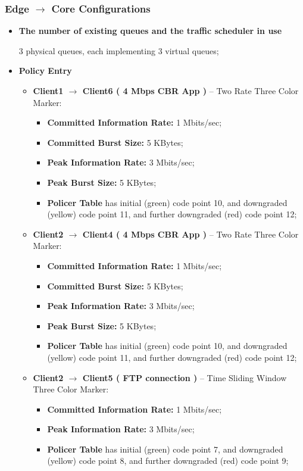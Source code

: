 \documentclass[conference,compsoc]{IEEEtran}
\begin{document}
     \subsubsection{Edge $\rightarrow$ Core Configurations}
     \begin{itemize}
     \item \textbf{The number of existing queues and the traffic scheduler in use} \par 
     3 physical queues, each implementing 3 virtual queues;  
     \vspace{5mm}
     \item \textbf{Policy Entry}
     \begin{itemize}
     
    	 \item \textbf{Client1 $\rightarrow$ Client6  ( 4 Mbps CBR App )} -- Two Rate Three Color Marker:
   	  	\begin{itemize}
   	 	 \item \textbf{Committed Information Rate:} 1 Mbits/sec;
   		  \item \textbf{Committed Burst Size:} 5 KBytes;
		    \item \textbf{Peak Information Rate:} 3 Mbits/sec;
		     \item \textbf{Peak Burst Size:} 5 KBytes;
  		   \item \textbf{Policer Table} has initial (green) code point 10, and downgraded (yellow) code point 11, and further downgraded (red) code point 12;
     		\end{itemize}
		
		\item \textbf{Client2 $\rightarrow$ Client4  ( 4 Mbps CBR App )} -- Two Rate Three Color Marker:
   	  	\begin{itemize}
   	 	 \item \textbf{Committed Information Rate:} 1 Mbits/sec;
   		  \item \textbf{Committed Burst Size:} 5 KBytes;
		    \item \textbf{Peak Information Rate:} 3 Mbits/sec;
		     \item \textbf{Peak Burst Size:} 5 KBytes;
  		   \item \textbf{Policer Table} has initial (green) code point 10, and downgraded (yellow) code point 11, and further downgraded (red) code point 12;
     		\end{itemize}
		
		
		\item \textbf{Client2 $\rightarrow$ Client5  ( FTP connection )} -- Time Sliding Window Three Color Marker:
   	  	\begin{itemize}
   	 	 \item \textbf{Committed Information Rate:} 1 Mbits/sec;
		    \item \textbf{Peak Information Rate:} 3 Mbits/sec;
  		   \item \textbf{Policer Table} has initial (green) code point 7, and downgraded (yellow) code point 8, and further downgraded (red) code point 9;
     		\end{itemize}
		

\end{itemize}
\end{itemize}
\end{document}
